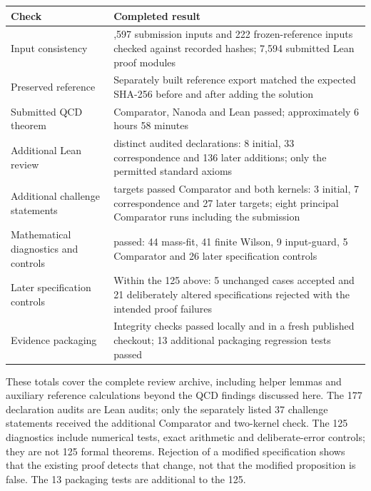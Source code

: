 \documentclass[
  11pt,
]{article}
\newcounter{none} %
\begin{document}
{\def\LTcaptype{none} %
\begin{longtable}[]{@{}
  >{\raggedright\arraybackslash}p{}
  >{\raggedright\arraybackslash}p{}@{}}
\toprule\noalign{}
\begin{minipage}[b]{\linewidth}\raggedright
Check
\end{minipage} & \begin{minipage}[b]{\linewidth}\raggedright
Completed result
\end{minipage} \\
\midrule\noalign{}
\endhead
\bottomrule\noalign{}
\endlastfoot
Input consistency & 7,597 submission inputs and 222 frozen-reference
inputs checked against recorded hashes; 7,594 submitted Lean proof
modules \\
Preserved reference & Separately built reference export matched the
expected SHA-256 before and after adding the solution \\
Submitted QCD theorem & Comparator, Nanoda and Lean passed;
approximately 6 hours 58 minutes \\
Additional Lean review & 177 distinct audited declarations: 8 initial,
33 correspondence and 136 later additions; only the permitted standard
axioms \\
Additional challenge statements & 37 targets passed Comparator and both
kernels: 3 initial, 7 correspondence and 27 later targets; eight
principal Comparator runs including the submission \\
Mathematical diagnostics and controls & 125 passed: 44 mass-fit, 41
finite Wilson, 9 input-guard, 5 Comparator and 26 later specification
controls \\
Later specification controls & Within the 125 above: 5 unchanged cases
accepted and 21 deliberately altered specifications rejected with the
intended proof failures \\
Evidence packaging & Integrity checks passed locally and in a fresh
published checkout; 13 additional packaging regression tests passed \\
\end{longtable}
}

These totals cover the complete review archive, including helper lemmas
and auxiliary reference calculations beyond the QCD findings discussed
here. The 177 declaration audits are Lean audits; only the separately
listed 37 challenge statements received the additional Comparator and
two-kernel check. The 125 diagnostics include numerical tests, exact
arithmetic and deliberate-error controls; they are not 125 formal
theorems. Rejection of a modified specification shows that the existing
proof detects that change, not that the modified proposition is false.
The 13 packaging tests are additional to the 125.
\end{document}
